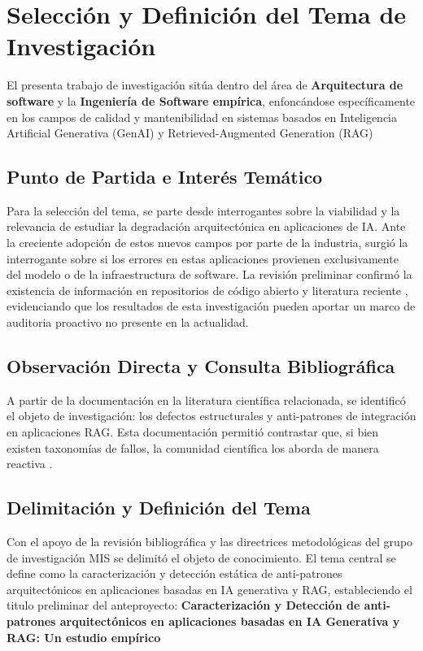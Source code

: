 \section{Selección y Definición del Tema de Investigación}

El presenta trabajo de investigación sitúa dentro del área de \textbf{Arquitectura de software} y la \textbf{Ingeniería de Software empírica}, enfoncándose específicamente en los campos de calidad y mantenibilidad en sistemas basados en Inteligencia Artificial Generativa (GenAI) y Retrieved-Augmented Generation (RAG)

\subsection{Punto de Partida e Interés Temático}
Para la selección del tema, se parte desde interrogantes sobre la viabilidad y la relevancia de estudiar la degradación arquitectónica en aplicaciones de IA. Ante la creciente adopción de estos nuevos campos por parte de la industria, surgió la interrogante sobre si los errores en estas aplicaciones provienen exclusivamente del modelo o de la infraestructura de software. La revisión preliminar confirmó la existencia de información en repositorios de código abierto y literatura reciente \cite{shao_are_2024}, evidenciando que los resultados de esta investigación pueden aportar un marco de auditoria proactivo no presente en la actualidad.  

\subsection{Observación Directa y Consulta Bibliográfica}
A partir de la documentación en la literatura científica relacionada, se identificó el objeto de investigación: los defectos estructurales y anti-patrones de integración en aplicaciones RAG. Esta documentación permitió contrastar que, si bien existen taxonomías de fallos, la comunidad científica los aborda de manera reactiva \cite{shao_are_2024}.

\subsection{Delimitación y Definición del Tema}
Con el apoyo de la revisión bibliográfica y las directrices metodológicas del grupo de investigación MIS se delimitó el objeto de conocimiento. El tema central se define como la caracterización y detección estática de anti-patrones arquitectónicos en aplicaciones basadas en IA generativa y RAG, estableciendo el titulo preliminar del anteproyecto: \textbf{Caracterización y Detección de anti-patrones arquitectónicos en aplicaciones basadas en IA Generativa y RAG: Un estudio empírico}